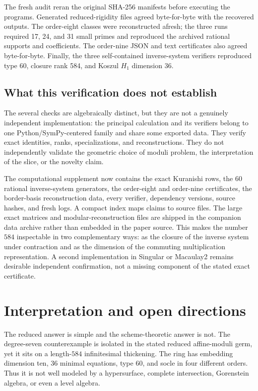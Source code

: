 \documentclass[11pt,reqno]{amsart}
\begin{document}
The fresh audit reran the original SHA-256 manifests before executing the
programs.  Generated reduced-rigidity files agreed byte-for-byte with the
recovered outputs.  The order-eight classes were reconstructed afresh; the
three runs required 17, 24, and 31 small primes and reproduced the archived
rational supports and coefficients.  The order-nine JSON and text
certificates also agreed byte-for-byte.  Finally, the three self-contained
inverse-system verifiers reproduced type 60, closure rank 584, and Koszul
\(H_1\) dimension 36.

\subsection*{What this verification does not establish}

The several checks are algebraically distinct, but they are not a
genuinely independent implementation: the principal calculation and its
verifiers belong to one Python/SymPy-centered family and share some exported
data.  They verify exact identities, ranks, specializations, and
reconstructions.  They do not independently validate the geometric choice of
moduli problem, the interpretation of the slice, or the novelty claim.

The computational supplement now contains the exact Kuranishi rows, the 60
rational inverse-system generators, the order-eight and order-nine
certificates, the border-basis reconstruction data, every verifier,
dependency versions, source hashes, and fresh logs.  A compact index maps
claims to source files.  The large exact matrices and modular-reconstruction
files are shipped in the companion data archive rather than embedded in the
paper source.  This makes the number \(584\) inspectable in two complementary
ways: as the closure of the inverse system under contraction and as the
dimension of the commuting multiplication representation.  A second
implementation in Singular or Macaulay2 remains desirable independent
confirmation, not a missing component of the stated exact certificate.

\section{Interpretation and open directions}
\label{sec:interpretation}

The reduced answer is simple and the scheme-theoretic answer is not.  The
degree-seven counterexample is isolated in the stated reduced affine-moduli
germ, yet it sits on a length-\(584\) infinitesimal thickening.  The ring has
embedding dimension ten, 36 minimal equations, type 60, and socle in four
different orders.  Thus it is not well modeled by a hypersurface, complete
intersection, Gorenstein algebra, or even a level algebra.
\end{document}
